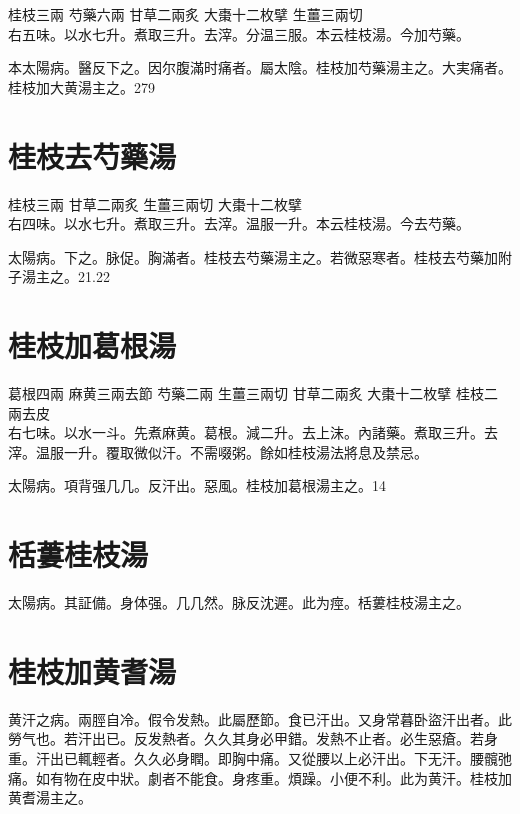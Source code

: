 \documentclass[12pt,twoside,UTF8,b5paper]{ctexbook}
\begin{document}
桂枝{\scriptsize 三兩} 芍藥{\scriptsize 六兩} 甘草{\scriptsize 二兩炙} 大棗{\scriptsize 十二枚擘} 生薑{\scriptsize 三兩切}\\
右五味。以水七升。煮取三升。去滓。分温三服。本云桂枝湯。今加芍藥。

{本}太陽病。醫反下之。因尔腹滿时痛者。屬太陰。桂枝加芍藥湯主之。大実痛者。桂枝加大黄湯主之。279

\section{桂枝去芍藥湯}

桂枝{\scriptsize 三兩} 甘草{\scriptsize 二兩炙} 生薑{\scriptsize 三兩切} 大棗{\scriptsize 十二枚擘}\\
右四味。以水七升。煮取三升。去滓。温服一升。本云桂枝湯。今去芍藥。

太陽病。下之。脉促。胸滿者。桂枝去芍藥湯主之。若微{惡}寒者。桂枝去芍藥加附子湯主之。21.22

\section{桂枝加葛根湯}

葛根{\scriptsize 四兩} 麻黄{\scriptsize 三兩去節} 芍藥{\scriptsize 二兩} 生薑{\scriptsize 三兩切} 甘草{\scriptsize 二兩炙} 大棗{\scriptsize 十二枚擘} 桂枝{\scriptsize 二兩去皮}\\
右七味。以水一斗。先煮麻黄。葛根。減二升。去上沫。內諸藥。煮取三升。去滓。温服一升。覆取微似汗。不需啜粥。餘如桂枝湯法將息及禁忌。

太陽病。項背强几几。反汗出。惡風。桂枝{加葛根}湯主之。14

\section{栝蔞桂枝湯}

太陽病。其証備。身体强。几几然。脉反沈遲。此为痙。栝蔞桂枝湯主之。

\section{桂枝加黄耆湯}

黄汗之病。兩脛自冷。假令发熱。此屬歷節。食已汗出。又身常暮{卧}盜汗出者。此勞气也。若汗出已。反发熱者。久久其身必甲錯。发熱不止者。必生惡瘡。若身重。汗出已輒輕者。久久必身瞤。即胸中痛。又從腰以上必汗出。下无汗。腰髖弛痛。如有物在皮中狀。劇者不能食。身疼重。煩躁。小便不利。此为黄汗。桂枝加黄耆湯主之。
\end{document}
